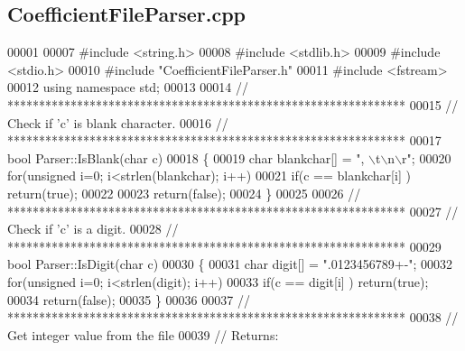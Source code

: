 \subsection{Coefficient\+File\+Parser.\+cpp}
\label{CoefficientFileParser_8cpp_source}

\begin{DoxyCode}
00001 
00007 \textcolor{preprocessor}{#include <string.h>}
00008 \textcolor{preprocessor}{#include <stdlib.h>}
00009 \textcolor{preprocessor}{#include <stdio.h>}
00010 \textcolor{preprocessor}{#include "CoefficientFileParser.h"}
00011 \textcolor{preprocessor}{#include <fstream>}
00012 \textcolor{keyword}{using namespace }std;
00013 
00014 \textcolor{comment}{// ***************************************************************}
00015 \textcolor{comment}{// Check if 'c' is blank character.}
00016 \textcolor{comment}{// ***************************************************************}
00017 \textcolor{keywordtype}{bool} Parser::IsBlank(\textcolor{keywordtype}{char} c)
00018 \{
00019     \textcolor{keywordtype}{char} blankchar[] = \textcolor{stringliteral}{", \(\backslash\)t\(\backslash\)n\(\backslash\)r"};
00020     \textcolor{keywordflow}{for}(\textcolor{keywordtype}{unsigned} i=0; i<strlen(blankchar); i++)
00021             \textcolor{keywordflow}{if}(c == blankchar[i] ) \textcolor{keywordflow}{return}(\textcolor{keyword}{true});
00022 
00023     \textcolor{keywordflow}{return}(\textcolor{keyword}{false});
00024 \}
00025 
00026 \textcolor{comment}{// ***************************************************************}
00027 \textcolor{comment}{// Check if 'c' is a digit.}
00028 \textcolor{comment}{// ***************************************************************}
00029 \textcolor{keywordtype}{bool} Parser::IsDigit(\textcolor{keywordtype}{char} c)
00030 \{
00031     \textcolor{keywordtype}{char} digit[] = \textcolor{stringliteral}{".0123456789+-"};
00032     \textcolor{keywordflow}{for}(\textcolor{keywordtype}{unsigned} i=0; i<strlen(digit); i++)
00033             \textcolor{keywordflow}{if}(c == digit[i] ) \textcolor{keywordflow}{return}(\textcolor{keyword}{true});
00034     \textcolor{keywordflow}{return}(\textcolor{keyword}{false});
00035 \}
00036 
00037 \textcolor{comment}{// ***************************************************************}
00038 \textcolor{comment}{//  Get integer value from the file}
00039 \textcolor{comment}{//  Returns:}

\end{DoxyCode}
